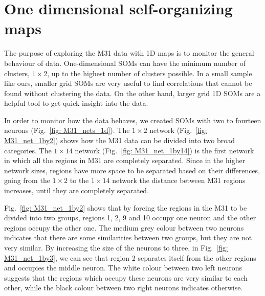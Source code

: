 \section{One dimensional self-organizing maps}
    \label{Sec: 1d_cluster}
    The purpose of  exploring the M31 data with 1D maps is to monitor the general behaviour of data. 
    One-dimensional SOMs can have the minimum number of clusters, $1\times2$, up to the highest number of clusters possible.
    In a small sample like ours, smaller grid SOMs are very useful to find correlations that cannot be found without  clustering the data.
    On the other hand, larger grid 1D SOMs are a helpful tool to get quick insight into the data.

        In order to monitor how the data behaves, we created SOMs with two to fourteen neurons (Fig.~\ref{fig: M31_nets_1d}).
        The $1\times2$ network (Fig.~\ref{fig: M31_net_1by2}) shows how the M31 data can be divided into two broad categories.
        The $1\times14$ network (Fig.~\ref{fig: M31_net_1by14}) is the first network in which all the regions in M31 are completely separated.
        Since in the higher network sizes, regions have more space to be separated based on their differences,  going from the $1\times2$ to the $1\times14$ network the distance between M31 regions increases, until they are completely separated. 
        
      Fig.~\ref{fig: M31_net_1by2} shows that by forcing the regions in the M31 to be divided into two groups, regions 1, 2, 9 and 10 occupy one neuron and the other regions occupy the other one.
        The medium grey colour between two neurons indicates that there are some similarities between two groups, but they are not very similar. 
        By increasing the size of the neurons to three, in Fig.~\ref{fig: M31_net_1by3}, we can see that region 2 separates itself from the other regions and occupies the middle neuron.
        The white colour between two left neurons suggests that the regions which occupy these neurons are very similar to each other, while the black colour between two right neurons indicates otherwise.
        
